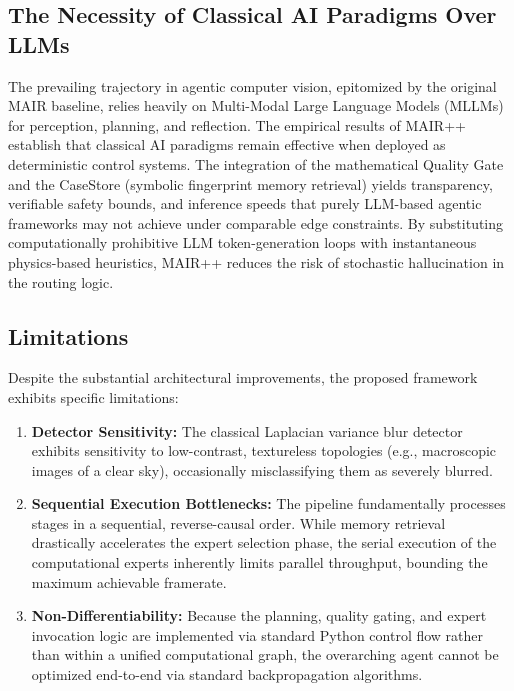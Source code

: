 \documentclass[journal, 10pt]{IEEEtran}
\begin{document}
\subsection{The Necessity of Classical AI Paradigms Over LLMs}
The prevailing trajectory in agentic computer vision, epitomized by the original MAIR baseline, relies heavily on Multi-Modal Large Language Models (MLLMs) for perception, planning, and reflection. The empirical results of MAIR++ establish that classical AI paradigms remain effective when deployed as deterministic control systems. The integration of the mathematical Quality Gate and the CaseStore (symbolic fingerprint memory retrieval) yields transparency, verifiable safety bounds, and inference speeds that purely LLM-based agentic frameworks may not achieve under comparable edge constraints. By substituting computationally prohibitive LLM token-generation loops with instantaneous physics-based heuristics, MAIR++ reduces the risk of stochastic hallucination in the routing logic.

\subsection{Limitations}
Despite the substantial architectural improvements, the proposed framework exhibits specific limitations:
\begin{enumerate}
    \item \textbf{Detector Sensitivity:} The classical Laplacian variance blur detector exhibits sensitivity to low-contrast, textureless topologies (e.g., macroscopic images of a clear sky), occasionally misclassifying them as severely blurred.
    \item \textbf{Sequential Execution Bottlenecks:} The pipeline fundamentally processes stages in a sequential, reverse-causal order. While memory retrieval drastically accelerates the expert selection phase, the serial execution of the computational experts inherently limits parallel throughput, bounding the maximum achievable framerate.
    \item \textbf{Non-Differentiability:} Because the planning, quality gating, and expert invocation logic are implemented via standard Python control flow rather than within a unified computational graph, the overarching agent cannot be optimized end-to-end via standard backpropagation algorithms.
\end{enumerate}
\end{document}
